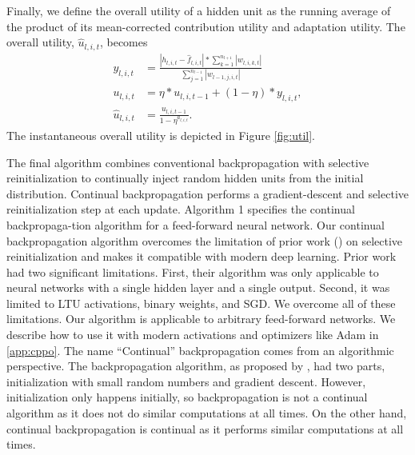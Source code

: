 \documentclass[review, number,3p]{elsarticle}
\begin{document}
Finally, we define the overall utility of a hidden unit as the running average of the product of its mean-corrected contribution utility and adaptation utility. The overall utility, $\hat{u}_{l, i, t}$, becomes
\begin{align}
\label{eq:util}
 y_{l, i, t} &= \frac{|h_{l, i, t} - \hat{f}_{l, i, t}| *\sum_{k=1}^{n_{l+1}} |w_{l, i, k, t}|}{\sum_{j=1}^{n_{l-1}} |w_{l-1, j, i, t}|} \\
 u_{l, i, t} &= \eta* u_{l, i, t-1} + (1 - \eta)* y_{l, i, t}, \\
\hat{u}_{l, i, t} &= \frac{u_{l, i, t-1}}{1 - \eta^{a_{l, i, t}}}.
\end{align}
The instantaneous overall utility is depicted in Figure \ref{fig:util}.

The final algorithm combines conventional backpropagation with selective reinitialization to continually inject random hidden units from the initial distribution. 
Continual backpropagation performs a gradient-descent and selective reinitialization step at each update. 
Algorithm 1 specifies the continual backpropaga-tion algorithm for a feed-forward neural network. 
Our continual backpropagation algorithm overcomes the limitation of prior work (\cite{kaelbling1993, mahmood2013}) on selective reinitialization and makes it compatible with modern deep learning. 
Prior work had two significant limitations.
First, their algorithm was only applicable to neural networks with a single hidden layer and a single output. 
Second, it was limited to LTU activations, binary weights, and SGD. 
We overcome all of these limitations. 
Our algorithm is applicable to arbitrary feed-forward networks.
We describe how to use it with modern activations and optimizers like Adam in \ref{app:cppo}.
The name ``Continual'' backpropagation comes from an algorithmic perspective. The backpropagation algorithm, as proposed by \cite{rumelhart1986learning}, had two parts, initialization with small random numbers and gradient descent.
However, initialization only happens initially, so backpropagation is not a continual algorithm as it does not do similar computations at all times. 
On the other hand, continual backpropagation is continual as it performs similar computations at all times.
\end{document}
